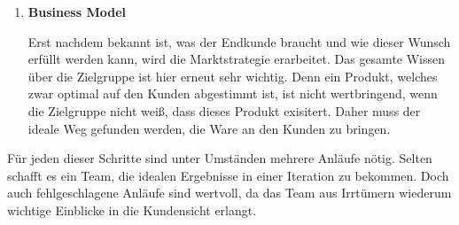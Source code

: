 \begin{enumerate}
	\item \textbf{Business Model}
	
	Erst nachdem bekannt ist, was der Endkunde braucht und wie dieser Wunsch erfüllt werden kann, wird die Marktstrategie erarbeitet. Das gesamte Wissen über die Zielgruppe ist hier erneut sehr wichtig. Denn ein Produkt, welches zwar optimal auf den Kunden abgestimmt ist, ist nicht wertbringend, wenn die Zielgruppe nicht weiß, dass dieses Produkt exisitert. Daher muss der ideale Weg gefunden werden, die Ware an den Kunden zu bringen. 
\end{enumerate}

Für jeden dieser Schritte sind unter Umständen mehrere Anläufe nötig. Selten schafft es ein Team, die idealen Ergebnisse in einer Iteration zu bekommen. Doch auch fehlgeschlagene Anläufe sind wertvoll, da das Team aus Irrtümern wiederum wichtige Einblicke in die Kundensicht erlangt. 
\cite{TheInnovatorsMethod}
\newpage 